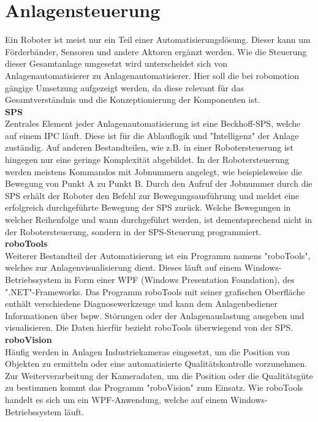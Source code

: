 \documentclass[ a4paper,
                oneside,
                toc=bibliography,
                toc=listof
                ]{scrbook}
\begin{document}
   	\section{Anlagensteuerung}
   	Ein Roboter ist meist nur ein Teil einer Automatisierungslösung. Dieser kann um Förderbänder, Sensoren und andere Aktoren ergänzt werden. Wie die Steuerung dieser Gesamtanlage umgesetzt wird unterscheidet sich von Anlagenautomatisierer zu Anlagenautomatisierer. Hier soll die bei robomotion gängige Umsetzung aufgezeigt werden, da diese relevant für das Gesamtverständnis und die Konzeptionierung der Komponenten ist. \\
   	\textbf{SPS}\\
   	Zentrales Element jeder Anlagenautomatisierung ist eine Beckhoff-SPS, welche auf einem IPC läuft. Diese ist für die Ablauflogik und "Intelligenz" der Anlage zuständig. Auf anderen Bestandteilen, wie z.B. in einer Robotersteuerung ist hingegen nur eine geringe Komplexität abgebildet. In der Robotersteuerung werden meistens Kommandos mit Jobnummern angelegt, wie beispielsweise die Bewegung von Punkt A zu Punkt B. Durch den Aufruf der Jobnummer durch die SPS erhält der Roboter den Befehl zur Bewegungsausführung und meldet eine erfolgreich durchgeführte Bewegung der SPS zurück. Welche Bewegungen in welcher Reihenfolge und wann durchgeführt werden, ist dementsprechend nicht in der Robotersteuerung, sondern in der SPS-Steuerung programmiert.\\
   	\textbf{roboTools} \\
   	Weiterer Bestandteil der Automatisierung ist ein Programm namens "roboTools", welches zur Anlagenvisualisierung dient. Dieses läuft auf einem Windows-Betriebssystem in Form einer WPF (Windows Presentation Foundation), des ".NET"-Frameworks. Das Programm roboTools mit seiner grafischen Oberfläche enthält verschiedene Diagnosewerkzeuge und kann dem Anlagenbediener Informationen über bspw. Störungen oder der Anlagenauslastung ausgeben und visualisieren. Die Daten hierfür bezieht roboTools überwiegend von der SPS. \\
   	\textbf{roboVision}\\
   	Häufig werden in Anlagen Industriekameras eingesetzt, um die Position von Objekten zu ermitteln oder eine automatisierte Qualitätskontrolle vorzunehmen. Zur Weiterverarbeitung der Kameradaten, um die Position oder die Qualitätsgüte zu bestimmen kommt das Programm "roboVision" zum Einsatz. Wie roboTools handelt es sich um ein WPF-Anwendung, welche auf einem Windows-Betriebssystem läuft. \\
\end{document}
